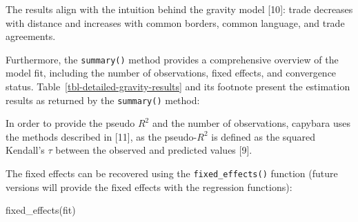\documentclass[
  10pt,
  letterpaper,
]{article}
\newenvironment{Shaded}{\begin{snugshade}}{\end{snugshade}}
\newcommand{\FunctionTok}[1]{\textcolor[rgb]{0.28,0.35,0.67}{#1}}
\newcommand{\NormalTok}[1]{\textcolor[rgb]{0.00,0.23,0.31}{#1}}
\begin{document}
The results align with the intuition behind the gravity model {[}10{]}:
trade decreases with distance and increases with common borders, common
language, and trade agreements.

Furthermore, the \texttt{summary()} method provides a comprehensive
overview of the model fit, including the number of observations, fixed
effects, and convergence status.
Table~\ref{tbl-detailed-gravity-results} and its footnote present the
estimation results as returned by the \texttt{summary()} method:

\begin{table}

\caption{\label{tbl-detailed-gravity-results}Summary results for the PPML gravity model. Significance codes: (***) 99.9\%; (**) 99\%; (*) 95\%; (.) 90\%. Pseudo $R^2$: 0.587. Number of observations: 28,152. Source: own creation.}


\end{table}%

In order to provide the pseudo \(R^2\) and the number of observations,
capybara uses the methods described in {[}11{]}, as the pseudo-\(R^2\)
is defined as the squared Kendall's \(\tau\) between the observed and
predicted values {[}9{]}.

The fixed effects can be recovered using the \texttt{fixed\_effects()}
function (future versions will provide the fixed effects with the
regression functions):

\begin{Shaded}
\begin{Highlighting}[]
\FunctionTok{fixed\_effects}\NormalTok{(fit)}
\end{Highlighting}
\end{Shaded}
\end{document}
